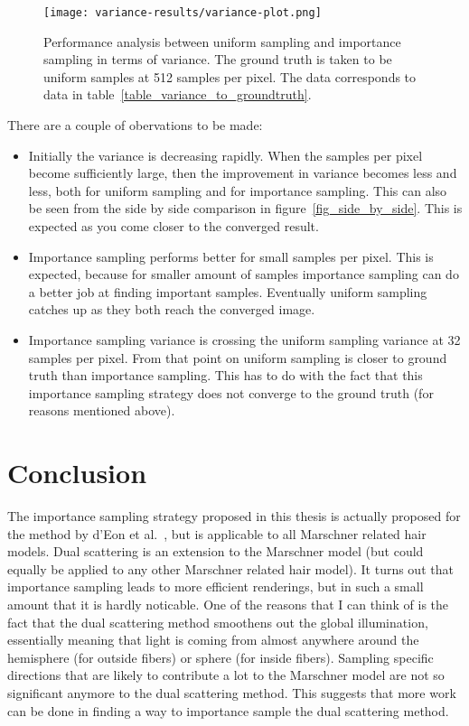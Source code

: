 \documentclass[11pt,a4paper]{report}
\begin{document}
\begin{figure}[h]
\begin{center}
\texttt{[image: variance-results/variance-plot.png]}
\end{center}
\caption{Performance analysis between uniform sampling and importance sampling in terms of variance. The ground truth is taken to be uniform samples at 512 samples per pixel. The data corresponds to data in table~\ref{table_variance_to_groundtruth}.}
\label{fig_variance_plot}
\end{figure}


There are a couple of obervations to be made:
\begin{itemize}

\item Initially the variance is decreasing rapidly. When the samples per pixel become sufficiently large, then the improvement in variance becomes less and less, both for uniform sampling and for importance sampling. This can also be seen from the side by side comparison in figure~\ref{fig_side_by_side}. This is expected as you come closer to the converged result.

\item Importance sampling performs better for small samples per pixel. This is expected, because for smaller amount of samples importance sampling can do a better job at finding important samples. Eventually uniform sampling catches up as they both reach the converged image.

\item Importance sampling variance is crossing the uniform sampling variance at 32 samples per pixel. From that point on uniform sampling is closer to ground truth than importance sampling. This has to do with the fact that this importance sampling strategy does not converge to the ground truth (for reasons mentioned above).


\end{itemize}


\chapter{Conclusion}

The importance sampling strategy proposed in this thesis is actually proposed for the method by d'Eon et al.~\cite{eon2011}, but is applicable to all Marschner related hair models. Dual scattering is an extension to the Marschner model (but could equally be applied to any other Marschner related hair model). It turns out that importance sampling leads to more efficient renderings, but in such a small amount that it is hardly noticable. One of the reasons that I can think of is the fact that the dual scattering method smoothens out the global illumination, essentially meaning that light is coming from almost anywhere around the hemisphere (for outside fibers) or sphere (for inside fibers). Sampling specific directions that are likely to contribute a lot to the Marschner model are not so significant anymore to the dual scattering method. This suggests that more work can be done in finding a way to importance sample the dual scattering method.
\end{document}

